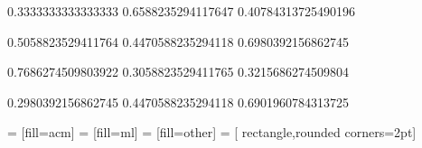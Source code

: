 \newcommand{\acmColor}{yellow}

\definecolor{ml}{rgb}
{0.3333333333333333  0.6588235294117647 0.40784313725490196}
\newcommand{\mlColor}{green}

\definecolor{other}{rgb}
{0.5058823529411764  0.4470588235294118 0.6980392156862745}
\newcommand{\otherColor}{purple}

\definecolor{db}{rgb}
{0.7686274509803922  0.3058823529411765 0.3215686274509804}
\newcommand{\dbColor}{red}

\definecolor{aov}{rgb}
{0.2980392156862745  0.4470588235294118 0.6901960784313725}
\newcommand{\aovColor}{blue}

 = [fill=acm]
 = [fill=ml]
 = [fill=other]
 = [ rectangle,rounded corners=2pt]


